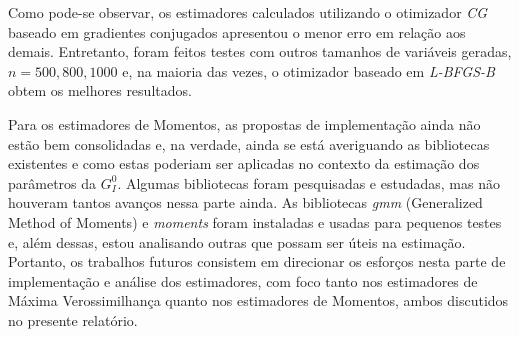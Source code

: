 \documentclass[12pt]{article}
\begin{document}
Como pode-se observar, os estimadores calculados utilizando o otimizador \emph{CG} baseado em gradientes conjugados apresentou o menor erro em relação aos demais. Entretanto, foram feitos testes com outros tamanhos de variáveis geradas, $n={500, 800, 1000}$ e, na maioria das vezes, o otimizador baseado em \emph{L-BFGS-B} obtem os melhores resultados.

Para os estimadores de Momentos, as propostas de implementação ainda não estão bem consolidadas e, na verdade, ainda se está averiguando as bibliotecas existentes e como estas poderiam ser aplicadas no contexto da estimação dos parâmetros da $G_I^0$. Algumas bibliotecas foram pesquisadas e estudadas, mas não houveram tantos avanços nessa parte ainda. As bibliotecas \textit{gmm} (Generalized Method of Moments) e \textit{moments} foram instaladas e usadas para pequenos testes e, além dessas, estou analisando outras que possam ser úteis na estimação. Portanto, os trabalhos futuros consistem em direcionar os esforços nesta parte de implementação e análise dos estimadores, com foco tanto nos estimadores de Máxima Verossimilhança quanto nos estimadores de Momentos, ambos discutidos no presente relatório. 

\newpage

%

%
\end{document}
